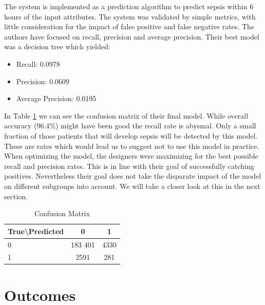 \documentclass[10pt,letterpaper]{article}
\begin{document}
\par The system is implemented as a prediction algorithm to predict sepsis within 6 hours of the input attributes. The system was validated by simple metrics, with little consideration for the impact of false positive and false negative rates. The authors have focused on recall, precision and average precision. Their best model was a decision tree which yielded:
\begin{itemize}
    \item Recall: 0.0978
    \item Precision: 0.0609
    \item Average Precision: 0.0195
\end{itemize}
In Table \ref{tab:conf_mat} we can see the confusion matrix of their final model. While overall accuracy (96.4\%) might have been good the recall rate is abysmal. Only a small fraction of those patients that will develop sepsis will be detected by this model. These are rates which would lead us to suggest not to use this model in practice. When optimizing the model, the designers were maximizing for the best possible recall and precision rates. This is in line with their goal of successfully catching positives. Nevertheless their goal does not take the disparate impact of the model on different subgroups into account. We will take a closer look at this in the next section.
\begin{table}[htpb!]
    \centering
    \begin{tabular}{l|cc}
        True\textbackslash{}Predicted & 0       & 1    \\ \hline
        0                             & 183 401 & 4330 \\
        1                             & 2591    & 281 
    \end{tabular}
    \caption{Confusion Matrix}
    \label{tab:conf_mat}
\end{table}

\section*{Outcomes}

\end{document}
